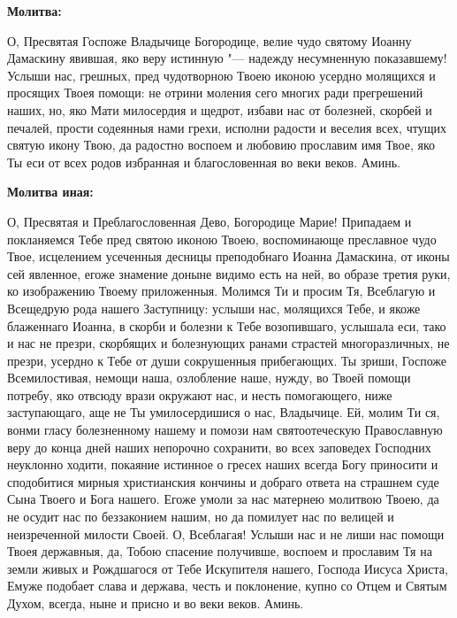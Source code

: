 \medskip


\bfseries Молитва:\normalfont{}\nopagebreak


О, Пресвятая Госпоже Владычице Богородице, велие чудо святому Иоанну Дамаскину явившая, яко веру истинную "--- надежду несумненную показавшему! Услыши нас, грешных, пред чудотворною Твоею иконою усердно молящихся и просящих Твоея помощи: не отрини моления сего многих ради прегрешений наших, но, яко Мати милосердия и щедрот, избави нас от болезней, скорбей и печалей, прости содеянныя нами грехи, исполни радости и веселия всех, чтущих святую икону Твою, да радостно воспоем и любовию прославим имя Твое, яко Ты еси от всех родов избранная и благословенная во веки веков. Аминь.


\medskip


\bfseries Молитва иная:\normalfont{}\nopagebreak


О, Пресвятая и Преблагословенная Дево, Богородице Марие! Припадаем и покланяемся Тебе пред святою иконою Твоею, воспоминающе преславное чудо Твое, исцелением усеченныя десницы преподобнаго Иоанна Дамаскина, от иконы сей явленное, егоже знамение доныне видимо есть на ней, во образе третия руки, ко изображению Твоему приложенныя. Молимся Ти и просим Тя, Всеблагую и Всещедрую рода нашего Заступницу: услыши нас, молящихся Тебе, и якоже блаженнаго Иоанна, в скорби и болезни к Тебе возопившаго, услышала еси, тако и нас не презри, скорбящих и болезнующих ранами страстей многоразличных, не презри, усердно к Тебе от души сокрушенныя прибегающих. Ты зриши, Госпоже Всемилостивая, немощи наша, озлобление наше, нужду, во Твоей помощи потребу, яко отвсюду врази окружают нас, и несть помогающего, ниже заступающаго, аще не Ты умилосердишися о нас, Владычице. Ей, молим Ти ся, вонми гласу болезненному нашему и помози нам святоотеческую Православную веру до конца дней наших непорочно сохранити, во всех заповедех Господних неуклонно ходити, покаяние истинное о гресех наших всегда Богу приносити и сподобитися мирныя христианския кончины и добраго ответа на страшнем суде Сына Твоего и Бога нашего. Егоже умоли за нас матернею молитвою Твоею, да не осудит нас по беззаконием нашим, но да помилует нас по велицей и неизреченной милости Своей. О, Всеблагая! Услыши нас и не лиши нас помощи Твоея державныя, да, Тобою спасение получивше, воспоем и прославим Тя на земли живых и Рождшагося от Тебе Искупителя нашего, Господа Иисуса Христа, Емуже подобает слава и держава, честь и поклонение, купно со Отцем и Святым Духом, всегда, ныне и присно и во веки веков. Аминь.


